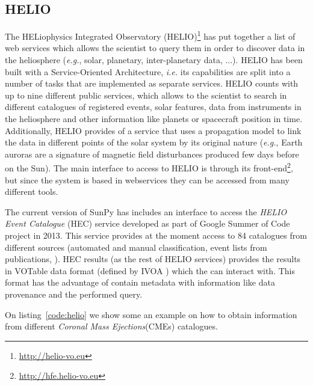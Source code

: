 \subsection{HELIO}\label{ssec:helio}

The HELiophysics Integrated Observatory 
(HELIO)\footnote{\url{http://helio-vo.eu}} has put together a list of web 
services which allows the scientist to query them in order to discover data in 
the heliosphere (\textit{e.g.}, solar, planetary, inter-planetary data, 
...)\cite{dps2012}. 
HELIO has been built with a Service-Oriented Architecture, 
\textit{i.e.} its capabilities are split into a number of tasks that are 
implemented as separate services. 
HELIO counts with up to nine different public services, which allows to the 
scientist to search in different catalogues of registered events, solar features,
data from instruments in the heliosphere and other information like planets or 
spacecraft position in time. 
Additionally, HELIO provides of a service that uses a propagation model to link 
the data in different points of the solar system by its original nature 
(\textit{e.g.}, Earth auroras are a signature of magnetic field disturbances 
produced few days before on the Sun).
The main interface to access to HELIO is through its front-end\footnote{
\url{http://hfe.helio-vo.eu}},
but since the system is based in webservices they can be accessed from many different tools.

The current version of SunPy has includes an interface to access the 
\textit{HELIO Event Catalogue} (HEC) service developed as part of Google
Summer of Code project in 2013.
This service provides at the moment access to 84 catalogues from different
sources (automated and manual classification, event lists from publications, \cdot).
HEC results (as the rest of HELIO services) provides the results in VOTable 
data format (defined by IVOA \cite{ochsenbein_ivoa_2011})
which the  can interact with.
This format has the advantage of contain metadata with information like
data provenance and the performed query.

On listing~\ref{code:helio} we show some an example on how to obtain information
from different \textit{Coronal Mass Ejections}(CMEs) catalogues.

